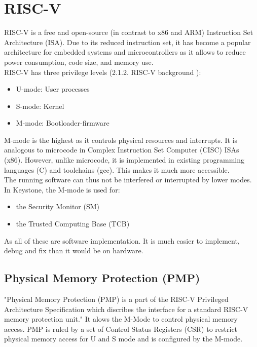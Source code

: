 \documentclass[11pt,a4paper]{report}
\begin{document}
\section{RISC-V}
RISC-V is a free and open-source (in contrast to x86 and ARM) Instruction Set Architecture (ISA).
Due to its reduced instruction set, it has become a popular architecture for embedded systems and microcontrollers as it allows to reduce power consumption, code size, and memory use\cite{riscv-manual}.
\\

RISC-V has three privilege levels (2.1.2. RISC-V background \cite{keystone-docs, review-keystone}):
\begin{itemize}
    \item U-mode: User processes
    \item S-mode: Kernel
    \item M-mode: Bootloader-firmware
\end{itemize}

M-mode is the highest as it controls physical resources and interrupts. 
It is analogous to microcode in Complex Instruction Set Computer (CISC) ISAs (x86).
However, unlike microcode, it is implemented in existing programming languages (C) and toolchains (gcc).
This makes it much more accessible.  
\\

The running software can thus not be interfered or interrupted by lower modes.
In Keystone, the M-mode is used for:
\begin{itemize}
    \item the Security Monitor (SM)
    \item the Trusted Computing Base (TCB)
\end{itemize}
As all of these are software implementation. It is much easier to implement, debug and fix than it would be on hardware.

\subsection{Physical Memory Protection (PMP)}
\label{sub:pmp}
"Physical Memory Protection (PMP) is a part of the RISC-V Privileged Architecture Specification which discribes the interface for a standard RISC-V memory protection unit."\cite{SiFive}
It alows the M-Mode to control physical memory access.
PMP is ruled by a set of Control Status Registers (CSR) to restrict physical memory access for U and S mode and is configured by the M-mode.
\end{document}
